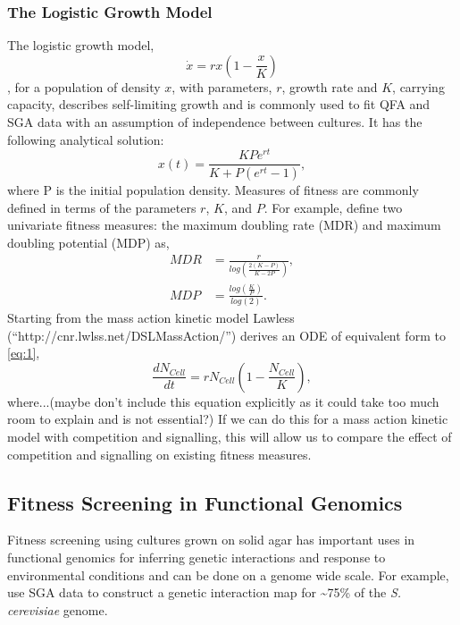 \begin{multicols}{2}
\subsubsection{The Logistic Growth Model}
\label{sec:logistic_model}
The logistic growth model,
\begin{equation}
  \label{eq:1}
  \dot{x} = rx\left(1 - \frac{x}{K}\right)
\end{equation}
\citep{Verhulst1845}, for a population of density \(x\), with parameters, \(r\), growth
rate and \(K\), carrying capacity, describes self-limiting growth and is commonly used
to fit QFA and SGA data with an assumption of independence between cultures. It has the
following analytical solution:
\begin{equation}
  \label{eq:2}
  x(t) = \frac{KPe^{rt}}{K + P(e^{rt}-1)},
\end{equation}
where P is the initial population density. Measures of fitness are commonly defined in
terms of the parameters \(r\), \(K\), and \(P\). For example, \cite{Addinall2011} define two univariate
fitness measures: the maximum doubling rate (MDR) and maximum doubling potential (MDP) as,
\begin{subequations}
  \label{eq:3}
    \begin{align}
      MDR &= \frac{r}{log\left(\frac{2(K-P)}{K-2P}\right)},\\
      MDP &= \frac{log\left(\frac{K}{P}\right)}{log(2)}.
    \end{align}
\end{subequations}
Starting from the mass action kinetic model Lawless (``http://cnr.lwlss.net/DSLMassAction/'')
derives an ODE of equivalent form to \ref{eq:1},
\begin{equation}
  \label{eq:8}
  \frac{dN_{Cell}}{dt} = rN_{Cell}\left(1 - \frac{N_{Cell}}{K}\right),
\end{equation}
where...(maybe don't include this equation explicitly as it could take too much room to
explain and is not essential?) If we can do this for a mass action kinetic model with competition and
signalling, this will allow us to compare the effect of competition and signalling on
existing fitness measures.

\subsection{Fitness Screening in Functional Genomics}
\label{sec:genetic-interaction}
Fitness screening using cultures grown on solid agar has important uses in functional
genomics for inferring genetic interactions and response to environmental conditions and
can be done on a genome wide scale. For example, \citet{Costanzo2010} use SGA data to
construct a genetic interaction map for \textasciitilde 75\% of the \textit{S. cerevisiae}
genome.


\end{multicols}
